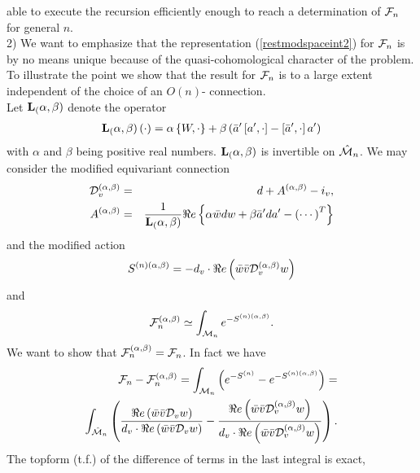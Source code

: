 \documentclass[a4paper,12pt]{article}
\begin{document}
able to execute the recursion efficiently enough to reach a 
determination of ${\cal F}_n$ for general $n$. \\ 
2) We want to emphasize that the representation (\ref{restmodspaceint2}) 
for ${\cal F}_n$ is by no means unique because of the quasi-cohomological 
character of the problem. To illustrate the point we show that the 
result for ${\cal F}_n$ is to a large extent independent of the choice 
of an $O(n)$- connection. \\ 
Let ${\bf L}_(\alpha, \beta)$ denote the operator 
\begin{eqnarray} 
{\bf L}_(\alpha, \beta)\left(\cdot \right) = 
\alpha \left\{W, \cdot \right\} +\beta \left(
\bar{a}'\left[a',\cdot \right]- \left[\bar{a}',\cdot \right]a'\right) 
\label{deformedl}
\end{eqnarray}
with $\alpha$ and $\beta$ being positive real numbers. 
${\bf L}_(\alpha, \beta)$ is invertible on $\hat{{\cal M}}_n$. 
We may consider the modified equivariant connection
\begin{eqnarray}
{\cal D}_v^{(\alpha, \beta)} &=&d+A^{(\alpha, \beta)}-i_v, \nonumber \\
A^{(\alpha, \beta)}&=&\frac{1}{{\bf L}_(\alpha, \beta)}\Re e \left\{
\alpha \bar{w}dw+\beta \bar{a}'da'-\left(\cdots \right)^T
\right\} \nonumber
\end{eqnarray}
and the modified action 
\begin{equation}
S^{(n)(\alpha, \beta)}=-d_v \cdot \Re e\left( \bar{w}\bar{v}
{\cal D}_v^{(\alpha, \beta)}w\right)  \nonumber
\end{equation}
and 
\begin{equation}
{\cal F}_n^{(\alpha, \beta)}\simeq \int_{{\cal M}_n}
e^{-S^{(n)(\alpha, \beta)}}.  \nonumber 
\end{equation}
We want to show that ${\cal F}_n^{(\alpha, \beta)}={\cal F}_n$. 
In fact we have 
\begin{eqnarray}
{\cal F}_n -{\cal F}_n^{(\alpha, \beta)}=\int_{{\cal M}_n} 
\left(e^{-S^{(n)}}-e^{-S^{(n)(\alpha, \beta)}}\right)= \nonumber \\
\int_{{\hat{{\cal M}}_n}} \left(\frac{ \Re e \left(\bar{w}\bar{v}
{\cal D}_v w\right)}{d_v \cdot  \Re e\left(\bar{w}\bar{v}
{\cal D}_v w\right)}-\frac{ \Re e \left(\bar{w}\bar{v}
{\cal D}_v^{(\alpha, \beta)}w\right)}{d_v \cdot \Re e 
\left(\bar{w}\bar{v}{\cal D}_v^{(\alpha, \beta)}w\right)}\right). \nonumber
\end{eqnarray}
The topform (t.f.) of the difference of terms in the last integral is exact, 
\end{document}
